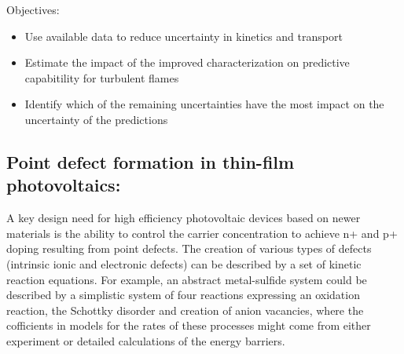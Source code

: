 \documentclass[11pt]{article}
\begin{document}
Objectives:
\begin{itemize}
\item Use available data to reduce uncertainty in kinetics and transport
\item Estimate the impact of the improved characterization on predictive capabitility for turbulent flames
\item Identify which of the remaining uncertainties have the most impact on the uncertainty of the predictions
\end{itemize}
 
\subsection*{Point defect formation in thin-film photovoltaics:}
A key design need for high efficiency photovoltaic devices based on newer materials 
is the ability to control the carrier concentration to achieve n+ and
p+ doping resulting from point defects. The creation of various types
of defects (intrinsic ionic and electronic defects) can be described
by a set of kinetic reaction equations. For example, an abstract
metal-sulfide system could be described by a simplistic system of four
reactions expressing an oxidation reaction, the Schottky disorder and
creation of anion vacancies, where the cofficients in models for the
rates of these processes might come from either experiment or detailed
calculations of the energy barriers. 
%
\end{document}
